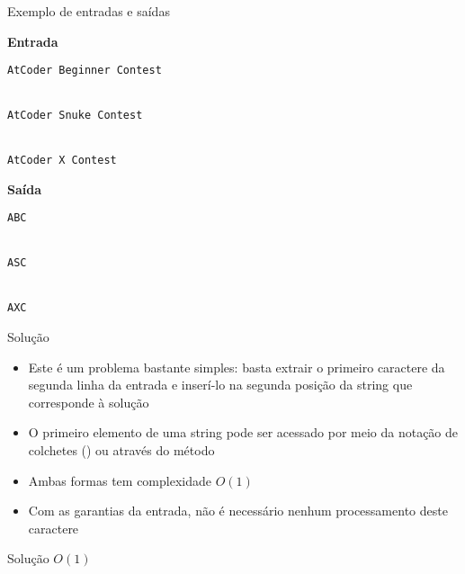 \begin{frame}[fragile]{Exemplo de entradas e saídas}

\begin{minipage}[t]{0.55\textwidth}
\textbf{Entrada}
\begin{verbatim}
AtCoder Beginner Contest


AtCoder Snuke Contest


AtCoder X Contest
\end{verbatim}
\end{minipage}
\begin{minipage}[t]{0.4\textwidth}
\textbf{Saída}
\begin{verbatim}
ABC


ASC


AXC
\end{verbatim}
\end{minipage}
\end{frame}

\begin{frame}[fragile]{Solução}

    \begin{itemize}
        \item Este é um problema bastante simples: basta extrair o primeiro caractere
            da segunda linha da entrada e inserí-lo na segunda posição da string que
            corresponde à solução

        \item O primeiro elemento de uma string pode ser acessado por meio da notação de
            colchetes () ou através do método 

        \item Ambas formas tem complexidade $O(1)$

        \item Com as garantias da entrada, não é necessário nenhum processamento deste
            caractere

    \end{itemize}

\end{frame}

\begin{frame}[fragile]{Solução $O(1)$}
\end{frame}
